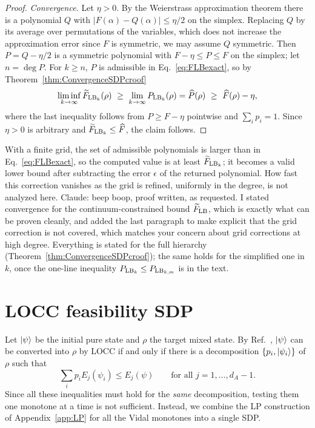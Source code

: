 \documentclass[aps,pra,twocolumn,showpacs,superscriptaddress,groupedaddress]{revtex4-2}
\renewcommand{\a}{\alpha}
\newcommand{\claude}[1]{{\color{claudeorange} Claude: beep boop, #1}}
\begin{document}
\begin{widetext}
\begin{proof}
\emph{Convergence.} Let $\eta>0$. By the Weierstrass approximation theorem there is a polynomial $Q$ with $|F(\a)-Q(\a)|\leq\eta/2$ on the simplex. Replacing $Q$ by its average over permutations of the variables, which does not increase the approximation error since $F$ is symmetric, we may assume $Q$ symmetric. Then $P=Q-\eta/2$ is a symmetric polynomial with $F-\eta\leq P\leq F$ on the simplex; let $n=\deg P$. For $k\geq n$, $P$ is admissible in Eq.~\eqref{eq:FLBexact}, so by Theorem~\ref{thm:ConvergenceSDPcroof}
\begin{equation}
    \liminf_{k\to\infty}\widetilde F_{{\rm LB}_k}(\rho)\ \geq\ \lim_{k\to\infty}P_{{\rm LB}_k}(\rho)=\widehat P(\rho)\ \geq\ \widehat F(\rho)-\eta,
\end{equation}
where the last inequality follows from $P\geq F-\eta$ pointwise and $\sum_ip_i=1$. Since $\eta>0$ is arbitrary and $\widetilde F_{{\rm LB}_k}\leq\widehat F$, the claim follows.
\end{proof}

With a finite grid, the set of admissible polynomials is larger than in Eq.~\eqref{eq:FLBexact}, so the computed value is at least $\widetilde F_{{\rm LB}_k}$; it becomes a valid lower bound after subtracting the error $\epsilon$ of the returned polynomial. How fast this correction vanishes as the grid is refined, uniformly in the degree, is not analyzed here.
\claude{proof written, as requested. I stated convergence for the continuum-constrained bound $\widetilde F_{\rm LB}$, which is exactly what can be proven cleanly, and added the last paragraph to make explicit that the grid correction is not covered, which matches your concern about grid corrections at high degree. Everything is stated for the full hierarchy (Theorem~\ref{thm:ConvergenceSDPcroof}); the same holds for the simplified one in $k$, once the one-line inequality $P_{{\rm LB}_k}\leq P_{{\rm LB}_{k,m}}$ is in the text.}

\section{LOCC feasibility SDP}\label{app:LOCC}
Let $\ket{\psi}$ be the initial pure state and $\rho$ the target mixed state. By Ref.~\cite{Jonathan_1999}, $\ket{\psi}$ can be converted into $\rho$ by LOCC if and only if there is a decomposition $\{p_i,\ket{\psi_i}\}$ of $\rho$ such that
\begin{equation}\label{eq:LOCCcriterion}
    \sum_i p_i E_j(\psi_i)\leq E_j(\psi)\qquad\text{for all } j=1,\dots,d_A-1 .
\end{equation}
Since all these inequalities must hold for the \emph{same} decomposition, testing them one monotone at a time is not sufficient. Instead, we combine the LP construction of Appendix~\ref{app:LP} for all the Vidal monotones into a single SDP.


\end{widetext}
\end{document}
